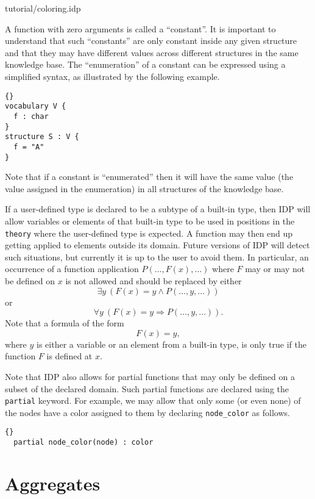 \documentclass{article}
\newcommand{\idp}{{\sc IDP}\xspace}
\newcommand{\limplies}{\ensuremath{\Rightarrow}}
\begin{document}

	{tutorial/coloring.idp}

A function with zero arguments is called a ``constant''.
It is important to understand that such ``constants'' are only constant
inside any given structure and that they may have different values
across different structures in the same knowledge base.
The ``enumeration'' of a constant can be expressed using a simplified
syntax, as illustrated by the following example.
\begin{lstlisting}{}
vocabulary V {
  f : char
}
structure S : V {
  f = "A"
}
\end{lstlisting}
Note that if a constant is ``enumerated'' then it will have the
same value (the value assigned in the enumeration) in all structures
of the knowledge base.

If a user-defined type is declared to be a subtype of a built-in type,
then \idp will allow variables or elements of that built-in type to
be used in positions in the \texttt{theory} where the user-defined
type is expected.  A function may then end up getting applied
to elements outside its domain.
Future versions of \idp will detect such situations, but currently
it is up to the user to avoid them.
In particular, an occurrence of a function application
$P(\ldots,F(x),\ldots)$ where $F$ may or may not be defined on $x$
is not allowed and should be replaced by either
$$\exists y\ (F(x) = y \land P(\ldots,y,\ldots))$$
or
$$\forall y\ (F(x) = y \limplies P(\ldots,y,\ldots)).$$
Note that a formula of the form
$$
F(x) = y,
$$
where $y$ is either a variable or an element from a built-in type,
is only true if the function $F$ is defined at $x$.

Note that \idp also allows for partial functions that may only be
defined on a subset of the declared domain.  Such partial functions
are declared using the \texttt{partial} keyword.
For example, we may allow that only some (or even none) of the nodes
have a color assigned to them by declaring \lstinline{node_color} as follows.
\begin{lstlisting}{}
  partial node_color(node) : color
\end{lstlisting}

\section{Aggregates}
\end{document}
